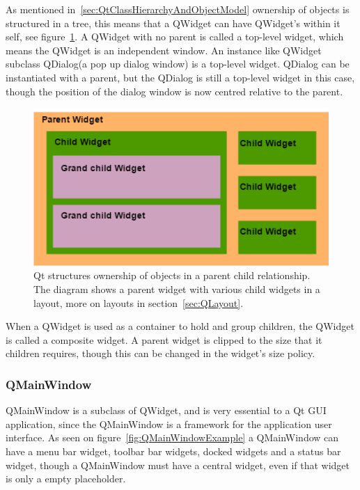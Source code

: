 As mentioned in~\ref{sec:QtClassHierarchyAndObjectModel} ownership of objects is structured in a tree, this means that a QWidget can have QWidget's within it self, see figure~\ref{fig:QWidgetExample}. A QWidget with no parent is called a top-level widget, which means the QWidget is an independent window. An instance like QWidget subclass QDialog(a pop up dialog window) is a top-level widget. QDialog can be instantiated with a parent, but the QDialog is still a top-level widget in this case, though the position of the dialog window is now centred relative to the parent.

\begin{figure}[h]
	\centering
	\includegraphics[scale=0.55]{Figures/QWidgetExample.png}
	\caption{Qt structures ownership of objects in a parent child relationship. The diagram shows a parent widget with various child widgets in a layout, more on layouts in section~\ref{sec:QLayout}.}
	\label{fig:QWidgetExample}
\end{figure}

When a QWidget is used as a container to hold and group children, the QWidget is called a composite widget. A parent widget is clipped to the size that it children requires, though this can be changed in the widget's size policy. 

\subsubsection{QMainWindow}
QMainWindow is a subclass of QWidget, and is very essential to a Qt GUI application, since the QMainWindow is a framework for the application user interface. As seen on figure~\ref{fig:QMainWindowExample} a QMainWindow can have a menu bar widget, toolbar bar widgets, docked widgets and a status bar widget, though a QMainWindow must have a central widget, even if that widget is only a empty placeholder. 

